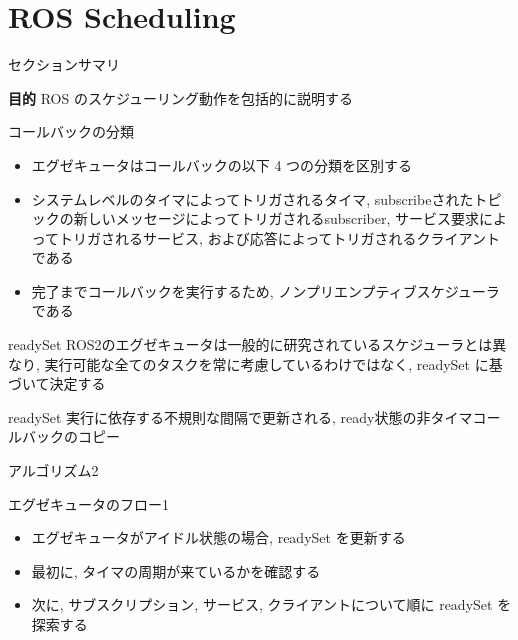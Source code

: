 
\section{ROS Scheduling}
\label{sec: ros scheduling}


\begin{frame}{セクションサマリ}
    \begin{itembox}[l]{\textbf{目的}}
        ROS のスケジューリング動作を包括的に説明する
    \end{itembox}
\end{frame}


\begin{frame}{コールバックの分類}
    \begin{itemize}
        \item エグゼキュータはコールバックの以下 4 つの分類を区別する
        \item システムレベルのタイマによってトリガされるタイマ, subscribeされたトピックの新しいメッセージによってトリガされるsubscriber, サービス要求によってトリガされるサービス, および応答によってトリガされるクライアントである
        \item 完了までコールバックを実行するため, ノンプリエンプティブスケジューラである
    \end{itemize}
\end{frame}

\begin{frame}{readySet}
    ROS2のエグゼキュータは一般的に研究されているスケジューラとは異なり, 実行可能な全てのタスクを常に考慮しているわけではなく, readySet に基づいて決定する
    \begin{block}{readySet}
        実行に依存する不規則な間隔で更新される, ready状態の非タイマコールバックのコピー
    \end{block}
\end{frame}

\begin{frame}{アルゴリズム2}
\end{frame}

\begin{frame}{エグゼキュータのフロー1}
    \begin{itemize}
        \item エグゼキュータがアイドル状態の場合, readySet を更新する
        \item 最初に, タイマの周期が来ているかを確認する
        \item 次に, サブスクリプション, サービス, クライアントについて順に readySet を探索する
    \end{itemize}
\end{frame}

